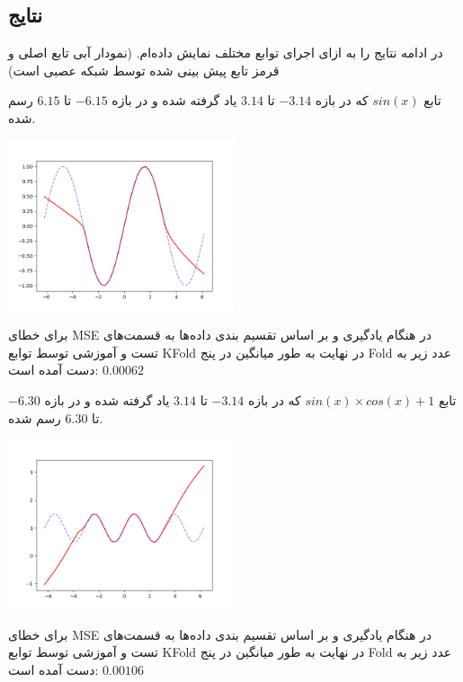 \documentclass[12pt,titlepage,a4page , tikz , multi,table , svgnames,xcdraw]{article}
\begin{document}
 

\newpage
\subsection{نتایج}
در ادامه نتایج را به ازای اجرای توابع مختلف نمایش داده‌ام. (نمودار آبی تابع اصلی و قرمز تابع پیش بینی شده توسط شبکه عصبی است)

تابع
 $sin(x)$ 
 که در بازه $-3.14$ تا $3.14$ یاد گرفته شده و در بازه $-6.15$ تا $6.15$ رسم شده.


\begin{center}

 \includegraphics[width=0.5\textwidth]{pictures/1.png}

\end{center}

برای خطای MSE در هنگام یادگیری و بر اساس تقسیم بندی داده‌ها به قسمت‌های تست و آموزشی توسط توابع KFold در نهایت به طور میانگین در پنج Fold عدد زیر به دست آمده است:
$0.00062$

\hrulefill

تابع
 $sin(x) \times cos(x) + 1$
  که در بازه $-3.14$ تا $3.14$ یاد گرفته شده و در بازه $-6.30$ تا $6.30$ رسم شده.


\begin{center}

 \includegraphics[width=0.5\textwidth]{pictures/2.png}

\end{center}

برای خطای MSE در هنگام یادگیری و بر اساس تقسیم بندی داده‌ها به قسمت‌های تست و آموزشی توسط توابع KFold در نهایت به طور میانگین در پنج Fold عدد زیر به دست آمده است:
$0.00106$
\end{document}
